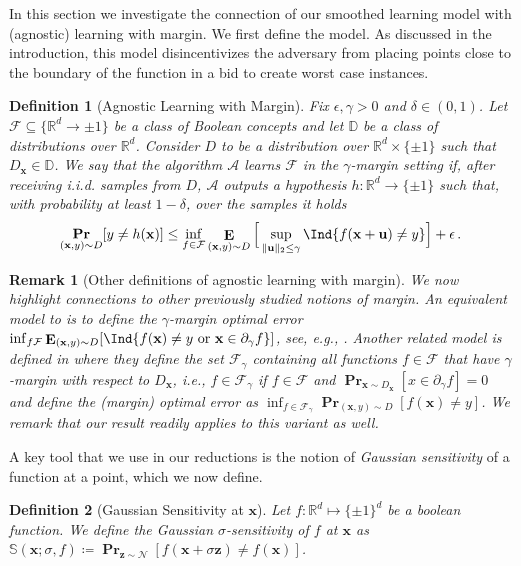 \documentclass[10pt,a4paper]{article}
\newtheorem{definition}{Definition}[section]
\newtheorem{remark}{Remark}[section]
\newcommand{\eqdef}{\coloneqq}
\renewcommand\vec[1]{\mathbf{#1}}
\DeclareMathOperator*{\pr}{\mathbf{Pr}}
\DeclareMathOperator*{\E}{\mathbf{E}}
\newcommand{\normal}{\mathcal{N}}
\newcommand{\R}{\mathbb{R}}
\newcommand{\N}{\mathbb{N}}
\newcommand{\eps}{\epsilon}
\newcommand{\1}{\Ind}
\newcommand{\x}{\vec x}
\newcommand{\z}{\vec z}
\newcommand{\F}{\mathcal{F}}
\newcommand{\Dmarginal}{D_{\x}}
\newcommand{\Djoint}{D}
\newcommand{\Alg}{\mathcal{A}}
\newcommand{\Dclass}{\mathbb{D}}
\begin{document}
In this section we investigate the connection of our smoothed learning model with (agnostic) learning with margin. We first define the model. As discussed in the introduction, this model disincentivizes the adversary from placing points close to the boundary of the function in a bid to create worst case instances.
\begin{definition}[Agnostic Learning with Margin]\label{definition:agnostic-margin} 
Fix $\eps, \gamma >0$ and $\delta\in (0,1)$.
Let $\F\subseteq\{\R^d\to {\pm 1}\}$ be a class of Boolean concepts and let $\Dclass$ be a class of distributions over $\R^d$.
    Consider $\Djoint$ to be a distribution over $\R^d\times \{\pm 1\}$ such that $\Dmarginal\in \Dclass$.
    We say that the algorithm $\Alg$ learns $\F$ in the $\gamma$-margin setting if, after receiving i.i.d. samples from $\Djoint$, 
    $\Alg$ outputs a hypothesis $h:\R^d \to \{\pm 1\}$ such that,
    with probability at least $1-\delta$, over the samples it holds
    \begin{equation}
        \pr_{(\x, y) \sim \Djoint}[y\neq h(\x)] \le 
        \inf_{f \in \mathcal F}
         \E_{(\x, y) \sim \Djoint}\Big[ \sup_{\|\vec u\|_2 \leq \gamma} \1\{f(\x + \vec u) \neq y \} \Big] + \eps \,.
    \end{equation}
\end{definition}
\begin{remark}[Other definitions of agnostic learning with margin]
    We now highlight connections to other previously studied notions of margin.
    An equivalent model to  is to define the $\gamma$-margin optimal error $\inf_{f \mathcal F} \E_{(\x,y)\sim D}[\1\{f(\x)\neq y\text{ or } \x\in \partial_{\gamma}f\}]$, see, e.g., \cite{diakonikolas19marginopt}.
    Another related model is defined in \cite{klivans-servedio-margin} where they define the set $\mathcal F_\gamma$ containing all functions $f\in \F$ that have $\gamma$-margin with respect to $D_\x$, i.e., $f \in \mathcal{F}_\gamma$ if $f \in \mathcal F$ and $\pr_{\x\sim D_{\x}}[x\in \partial_{\gamma}f]=0$ and define the (margin) optimal error as
    $\inf_{f \in \mathcal F_\gamma} \pr_{(\x, y) \sim D}[f(\x) \neq y]$.
    We remark that our result readily applies to this variant as well. 
\end{remark}

A key tool that we use in our reductions is the notion of \textit{Gaussian sensitivity} of a function at a point, which we now define. 
\begin{definition}[Gaussian Sensitivity at $\x$]
Let $f:\R^d \mapsto \{\pm 1\}^d$ be a boolean function.  We define the Gaussian $\sigma$-sensitivity of $f$ at $\x$ as $\mathbb{S}(\x;\sigma, f) \eqdef \pr_{\vec z \sim \normal}[f(\x + \sigma \z) \neq f(\x)]$.
\end{definition}
\end{document}
